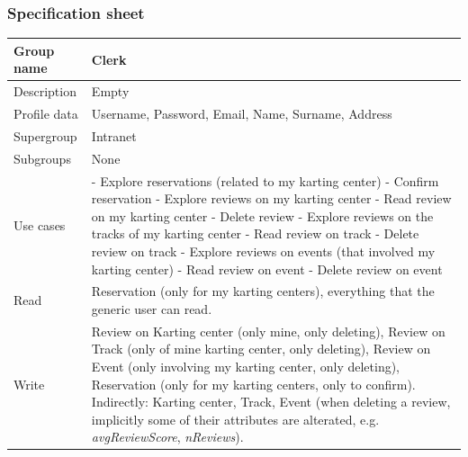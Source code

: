 \documentclass{beamer}
\begin{document}
\begin{frame}
    \frametitle{Specification sheet}
    \begin{table}
        \tiny
        \begin{tabular}{|p{2cm}|p{6cm}|}
        \hline
        Group name & \textbf{Clerk} \\
        \hline
        Description & Empty \\
        \hline
        Profile data & Username, Password, Email, Name, Surname, Address \\
        Supergroup & Intranet \\
        \hline
        Subgroups & None \\
        \hline
        Use cases &
        - Explore reservations (related to my karting center) \newline
        - Confirm reservation \newline
        - Explore reviews on my karting center \newline
        - Read review on my karting center \newline
        - Delete review \newline
        - Explore reviews on the tracks of my karting center \newline
        - Read review on track \newline
        - Delete review on track\newline
        - Explore reviews on events (that involved my karting center) \newline
        - Read review on event \newline
        - Delete review on event\\
        \hline
        Read & Reservation (only for my karting centers), everything 
        that the generic user can read. \\
        \hline
        Write & Review on Karting center (only mine, only deleting), Review on Track (only of mine karting center, only deleting), 
        Review on Event (only involving my karting center, only deleting), Reservation (only for my karting centers, only to confirm). \newline
        Indirectly: Karting center, Track, Event (when deleting a review, implicitly some of their 
        attributes are alterated, e.g. \textit{avgReviewScore}, \textit{nReviews}). \\
        \hline
        \end{tabular}
    \end{table}
\end{frame}
\end{document}
